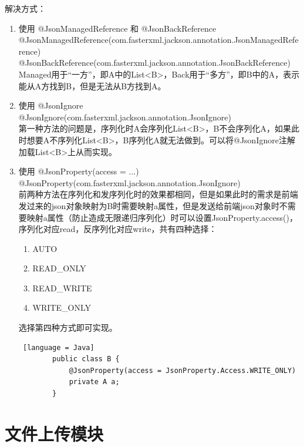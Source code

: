 解决方式：
\begin{enumerate}
  \item 使用 @JsonManagedReference 和 @JsonBackReference\\
        @JsonManagedReference(com.fasterxml.jackson.annotation.JsonManagedReference)\\
        @JsonBackReference(com.fasterxml.jackson.annotation.JsonBackReference)\\
        Managed用于“一方”，即A中的List<B>，Back用于“多方”，即B中的A，表示能从A方找到B，但是无法从B方找到A。
  \item 使用 @JsonIgnore\\
        @JsonIgnore(com.fasterxml.jackson.annotation.JsonIgnore)\\
        第一种方法的问题是，序列化时A会序列化List<B>，B不会序列化A，如果此时想要A不序列化List<B>，B序列化A就无法做到。可以将@JsonIgnore注解加载List<B>上从而实现。
  \item 使用 @JsonProperty(access = ...)\\
        @JsonProperty(com.fasterxml.jackson.annotation.JsonIgnore)\\
        前两种方法在序列化和发序列化时的效果都相同，但是如果此时的需求是前端发过来的json对象映射为B时需要映射a属性，但是发送给前端json对象时不需要映射a属性（防止造成无限递归序列化）时可以设置JsonProperty.access()，序列化对应read，反序列化对应write，共有四种选择：
        \begin{enumerate}
          \item AUTO
          \item READ\_ONLY
          \item READ\_WRITE
          \item WRITE\_ONLY
        \end{enumerate}
        选择第四种方式即可实现。
        \begin{lstlisting} [language = Java]
        public class B {
            @JsonProperty(access = JsonProperty.Access.WRITE_ONLY)
            private A a;
        }
    \end{lstlisting}
\end{enumerate}

\section{文件上传模块}

